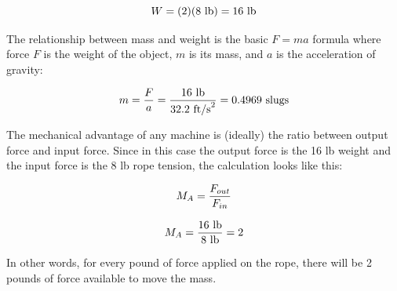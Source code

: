 $$W = (2) (8 \hbox{ lb}) = 16 \hbox{ lb}$$

\vskip 10pt

The relationship between mass and weight is the basic $F = ma$ formula where force $F$ is the weight of the object, $m$ is its mass, and $a$ is the acceleration of gravity:

$$m = {F \over a} = {16 \hbox{ lb} \over 32.2 \hbox{ ft/s}^2} = 0.4969 \hbox{ slugs}$$

\vskip 10pt

The mechanical advantage of any machine is (ideally) the ratio between output force and input force.  Since in this case the output force is the 16 lb weight and the input force is the 8 lb rope tension, the calculation looks like this:

$$M_A = {F_{out} \over F_{in}}$$

$$M_A = {16 \hbox{ lb} \over 8 \hbox{ lb}} = 2$$

In other words, for every pound of force applied on the rope, there will be 2 pounds of force available to move the mass.











